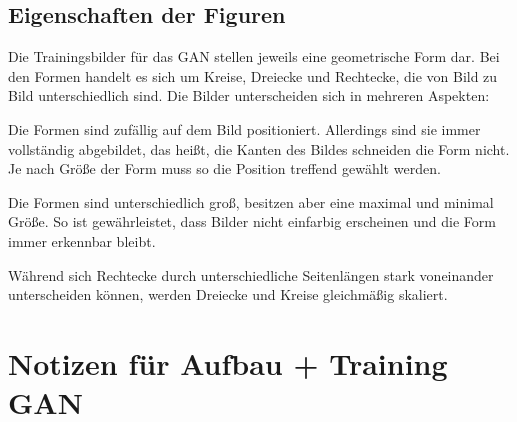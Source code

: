 \subsection{Eigenschaften der Figuren}
Die Trainingsbilder für das GAN stellen jeweils eine geometrische Form dar.
Bei den Formen handelt es sich um Kreise, Dreiecke und Rechtecke, die von Bild zu Bild unterschiedlich sind.
Die Bilder unterscheiden sich in mehreren Aspekten:
\begin{description}[style=nextline]
	\item[Position]
	Die Formen sind zufällig auf dem Bild positioniert.
	Allerdings sind sie immer vollständig abgebildet, das heißt, die Kanten des Bildes schneiden die Form nicht.
	Je nach Größe der Form muss so die Position treffend gewählt werden.
	
	\item[Größe und Form]
	Die Formen sind unterschiedlich groß, besitzen aber eine maximal und minimal Größe.
	So ist gewährleistet, dass Bilder nicht einfarbig erscheinen und die Form immer erkennbar bleibt.
	
	Während sich Rechtecke durch unterschiedliche Seitenlängen stark voneinander unterscheiden können, werden Dreiecke und Kreise gleichmäßig skaliert.
\end{description}

\section{Notizen für Aufbau + Training GAN}


